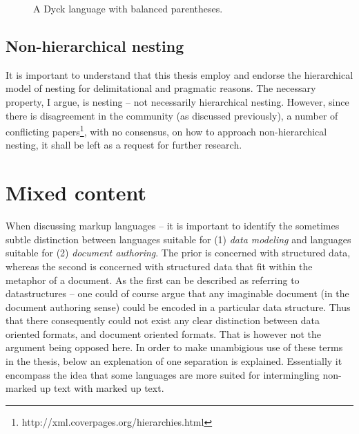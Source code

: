 \documentclass{scrreprt}
\begin{document}
\begin{figure}[h]
\centering
{}
\caption{A Dyck language with balanced parentheses.}
\label{fig:mixed-content-nesting}
\end{figure}







\subsection{Non-hierarchical nesting}
\label{sec:non-hierarchical-nesting}
It is important to understand that this thesis employ and endorse the hierarchical model of nesting for delimitational and pragmatic reasons. The necessary property, I argue, is nesting -- not necessarily hierarchical nesting. However, since there is disagreement in the community (as discussed previously), a number of conflicting papers\footnote{http://xml.coverpages.org/hierarchies.html}, with no consensus, on how to approach non-hierarchical nesting, it shall be left as a request for further research.











\section{Mixed content}
\label{sec:mixed-content}
When discussing markup languages -- it is important to identify the sometimes subtle distinction between languages suitable for (1) \emph{data modeling} and languages suitable for (2) \emph{document authoring}. The prior is concerned with structured data, whereas the second is concerned with structured data that fit within the metaphor  of a document. As the first can be described as referring to datastructures -- one could of course argue that any imaginable document (in the document authoring sense) could be encoded in a particular data structure. Thus that there consequently could not exist any clear distinction between data oriented formats, and document oriented formats. That is however not the argument being opposed here. In order to make unambigious use of these terms in the thesis, below an explenation of one separation is explained. Essentially it encompass the idea that some languages are more suited for intermingling non-marked up text with marked up text.
\end{document}
